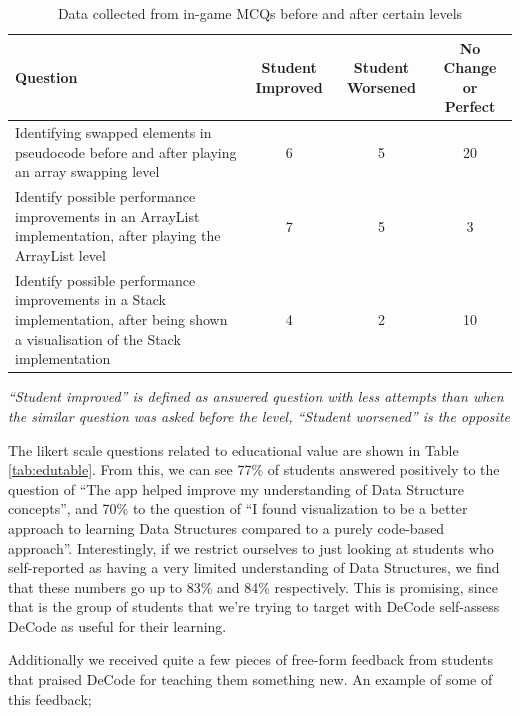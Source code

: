 \documentclass[11pt]{article}
\begin{document}
\begin{table}[]
  \small
  \begin{tabulary}{\linewidth}{|L|C|C|C|}
  \hline
  \textbf{Question}                                                                                                                   & \textbf{Student Improved} & \textbf{Student Worsened} & \textbf{No Change or Perfect} \\ \hline
  Identifying swapped elements in pseudocode before and after playing an array swapping level                                         & 6                         & 5                         & 20                         \\ \hline
  Identify possible performance improvements in an ArrayList implementation, after playing the ArrayList level                        & 7                         & 5                         & 3                          \\ \hline
  Identify possible performance improvements in a Stack implementation, after being shown a visualisation of the Stack implementation & 4                         & 2                         & 10                         \\ \hline
   \end{tabulary}
   \emph{``Student improved'' is defined as answered question with less attempts than when the similar question was asked before the level, ``Student worsened'' is the opposite}
  \caption{Data collected from in-game MCQs before and after certain levels}
  \label{tab:edudatatable}
\end{table}
The likert scale questions related to educational value are shown in Table \ref{tab:edutable}. From this, we can see 77\% of students answered positively to the question of ``The app helped improve my understanding of Data Structure concepts'', and 70\% to the question of ``I found visualization to be a better approach to learning Data Structures compared to a purely code-based approach''. Interestingly, if we restrict ourselves to just looking at students who self-reported as having a very limited understanding of Data Structures, we find that these numbers go up to 83\% and 84\% respectively. This is promising, since that is the group of students that we're trying to target with DeCode self-assess DeCode as useful for their learning.\par
Additionally we received quite a few pieces of free-form feedback from students that praised DeCode for teaching them something new. An example of some of this feedback;
\end{document}
